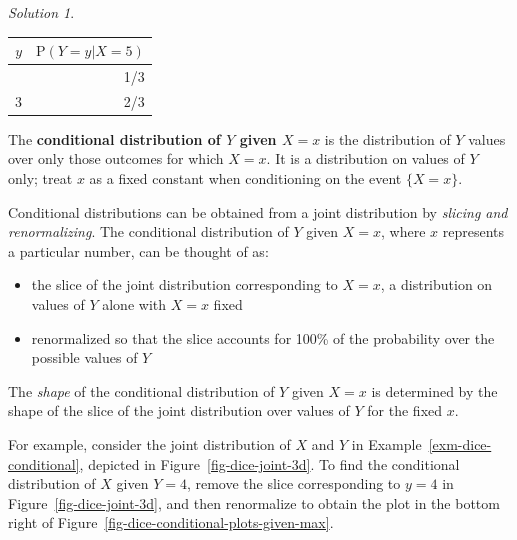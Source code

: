 \documentclass[
  letterpaper,
  DIV=11,
  numbers=noendperiod]{scrreprt}
\providecommand{\tightlist}{%
  \setlength{\itemsep}{0pt}\setlength{\parskip}{0pt}}
\theoremstyle{plain}
\theoremstyle{definition}
\theoremstyle{definition}
\theoremstyle{definition}
\theoremstyle{remark}
\newtheorem{refsolution}{Solution}[chapter]
\begin{document}
\begin{tcolorbox}
\begin{refsolution}
\begin{enumerate}
  \begin{longtable}[]{@{}rr@{}}
  \toprule\noalign{}
  \(y\) & \(\textrm{P}(Y = y | X = 5)\) \\
  \midrule\noalign{}
  \endhead
  \bottomrule\noalign{}
  \endlastfoot
  2 & 1/3 \\
  3 & 2/3 \\
  \end{longtable}
\end{enumerate}

\label{sol-dice-conditional}

\end{refsolution}

\end{tcolorbox}

The \textbf{conditional distribution of \(Y\) given \(X=x\)} is the
distribution of \(Y\) values over only those outcomes for which \(X=x\).
It is a distribution on values of \(Y\) only; treat \(x\) as a fixed
constant when conditioning on the event \(\{X=x\}\).

Conditional distributions can be obtained from a joint distribution by
\emph{slicing and renormalizing}. The conditional distribution of \(Y\)
given \(X=x\), where \(x\) represents a particular number, can be
thought of as:

\begin{itemize}
\tightlist
\item
  the slice of the joint distribution corresponding to \(X=x\), a
  distribution on values of \(Y\) alone with \(X=x\) fixed
\item
  renormalized so that the slice accounts for 100\% of the probability
  over the possible values of \(Y\)
\end{itemize}

The \emph{shape} of the conditional distribution of \(Y\) given \(X=x\)
is determined by the shape of the slice of the joint distribution over
values of \(Y\) for the fixed \(x\).

For example, consider the joint distribution of \(X\) and \(Y\) in
Example~\ref{exm-dice-conditional}, depicted in
Figure~\ref{fig-dice-joint-3d}. To find the conditional distribution of
\(X\) given \(Y=4\), remove the slice corresponding to \(y=4\) in
Figure~\ref{fig-dice-joint-3d}, and then renormalize to obtain the plot
in the bottom right of
Figure~\ref{fig-dice-conditional-plots-given-max}.
\end{document}
